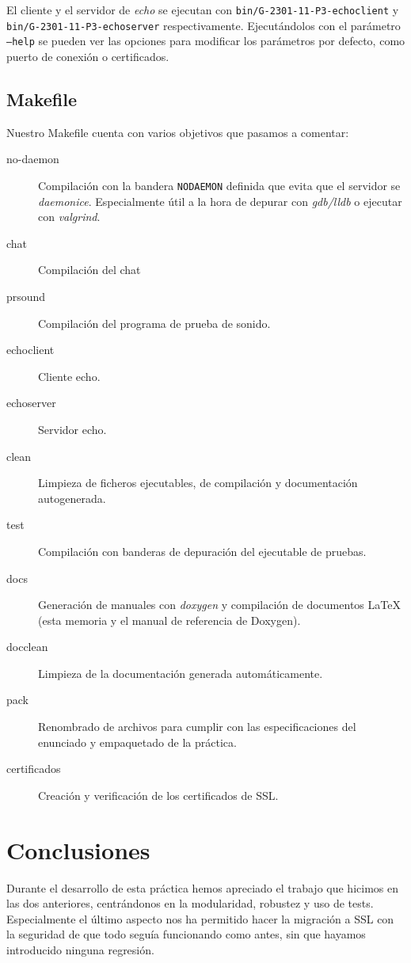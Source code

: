\documentclass{article}
\begin{document}
El cliente y el servidor de \textit{echo} se ejecutan con \texttt{bin/G-2301-11-P3-echoclient} y \texttt{bin/G-2301-11-P3-echoserver} respectivamente. Ejecutándolos con el parámetro \texttt{--help} se pueden ver las opciones para modificar los parámetros por defecto, como puerto de conexión o certificados.

\subsection{Makefile}

Nuestro Makefile cuenta con varios objetivos que pasamos a comentar:

\begin{description}
\item[no-daemon] Compilación con la bandera \texttt{NODAEMON} definida que evita que el servidor se \textit{daemonice}. Especialmente útil a la hora de depurar con \textit{gdb/lldb} o ejecutar con \textit{valgrind}.
\item[chat] Compilación del chat
\item[prsound] Compilación del programa de prueba de sonido.
\item[echoclient] Cliente echo.
\item[echoserver] Servidor echo.
\item[clean] Limpieza de ficheros ejecutables, de compilación y documentación autogenerada.
\item[test] Compilación con banderas de depuración del ejecutable de pruebas.
\item[docs] Generación de manuales con \textit{doxygen} y compilación de documentos LaTeX (esta memoria y el manual de referencia de Doxygen). 
\item[docclean] Limpieza de la documentación generada automáticamente.
\item[pack] Renombrado de archivos para cumplir con las especificaciones del enunciado y empaquetado de la práctica.
\item[certificados] Creación y verificación de los certificados de SSL.
\end{description}

\section{Conclusiones}

Durante el desarrollo de esta práctica hemos apreciado el trabajo que hicimos en las dos anteriores, centrándonos en la modularidad, robustez y uso de tests. Especialmente el último aspecto nos ha permitido hacer la migración a SSL con la seguridad de que todo seguía funcionando como antes, sin que hayamos introducido ninguna regresión.
\end{document}
